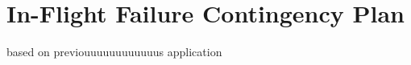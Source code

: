 \section{In-Flight Failure Contingency Plan}
\label{sec:Failure}
based on previouuuuuuuuuuuus application

